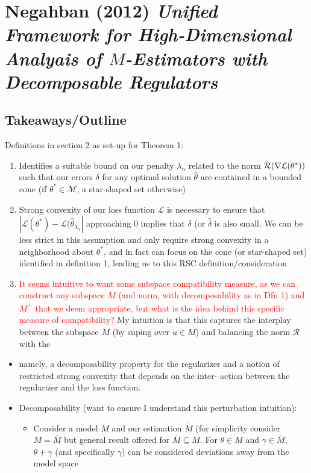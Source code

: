 \documentclass[11pt]{article}
\begin{document}
	
\newpage 

\section*{Negahban (2012) {\large \it Unified Framework for High-Dimensional Analyais of $M$-Estimators with Decomposable Regulators}}

\subsection*{Takeaways/Outline}


Definitions in section 2 as set-up for Theorem 1:
\begin{enumerate}
	\item Identifies a suitable bound on our penalty $\lambda_n$ related to the norm $\mathcal{R}(\nabla \mathcal{L}(\theta^*))$ such that our errors $\delta$ for any optimal solution $\hat{\theta}$ are contained in a bounded cone (if $\theta^* \in \mathcal{M}$, a star-shaped set otherwise)
	\item Strong convexity of our loss function $\mathcal{L}$ is necessary to ensure that $|\mathcal{L}(\theta^*) - \mathcal{L}(\hat{\theta}_{\lambda_n}|$ approaching 0 implies that $\delta$ (or $\hat{\delta}$ is also small. We can be less strict in this assumption and only require strong convexity in a neighborhood about $\theta^*$, and in fact can focus on the cone (or star-shaped set) identified in definition 1, leading us to this RSC definition/consideration 
	\item \textcolor{red}{It seems intuitive to want some subspace compatibility measure, as we can construct any subspace $M$ (and norm, with decomposability as in Dfn 1) and $\overline{M}^\perp$ that we deem appropriate, but what is the idea behind this specific measure of compatibility? } My intuition is that this captures the interplay between the subspace $M$ (by suping over $u \in M$) and balancing the norm $\mathcal{R}$ with the 
\end{enumerate}

\begin{itemize}
	\item namely, a decomposability property for the regularizer and a notion of restricted strong convexity that depends on the inter- action between the regularizer and the loss function.
	\item Decomposability (want to ensure I understand this perturbation intuition): 
		\begin{itemize}
            \item Consider a model $M$ and our estimation $\overline{M}$ (for simplicity consider $M = \overline{M}$ but general result offered for $\overline{M} \subseteq M$. For $\theta \in M$ and $\gamma \in \overline{M}$, $\theta+\gamma$ (and specifically $\gamma$) can be considered deviations away from the model space 
        \end{itemize}
\end{itemize}
\end{document}
